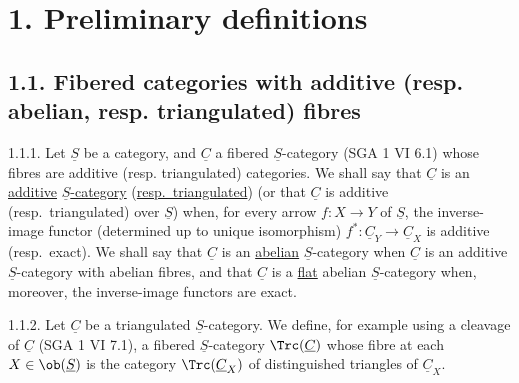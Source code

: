 \section*{1. Preliminary definitions}

\subsection*{1.1. Fibered categories with additive (resp. abelian, resp. triangulated) fibres}

1.1.1. Let \(\underline{S}\) be a category, and \(\underline{C}\) a fibered \(\underline{S}\)-category (SGA 1 VI 6.1) whose fibres are additive (resp. triangulated) categories. We shall say that \(\underline{C}\) is an \uline{additive} \(\underline{S}\)\uline{-category} (\uline{resp.\ triangulated}) (or that \(\underline{C}\) is additive (resp.\ triangulated) over \(\underline{S}\)) when, for every arrow \(f:X\to Y\) of \(\underline{S}\), the inverse-image functor (determined up to unique isomorphism) \(f^*:\underline{C}_Y\longrightarrow \underline{C}_X\) is additive (resp.\ exact). We shall say that \(\underline{C}\) is an \uline{abelian} \(\underline{S}\)-category when \(\underline{C}\) is an additive \(\underline{S}\)-category with abelian fibres, and that \(\underline{C}\) is a \uline{flat} abelian \(\underline{S}\)-category when, moreover, the inverse-image functors are exact.

1.1.2. Let \(\underline{C}\) be a triangulated \(\underline{S}\)-category. We define, for example using a cleavage of \(\underline{C}\) (SGA 1 VI 7.1), a fibered \(\underline{S}\)-category \(\Trc(\underline{C})\) whose fibre at each \(X\in \ob(\underline{S})\) is the category \(\Trc(\underline{C}_X)\) of distinguished triangles of \(\underline{C}_X\).


